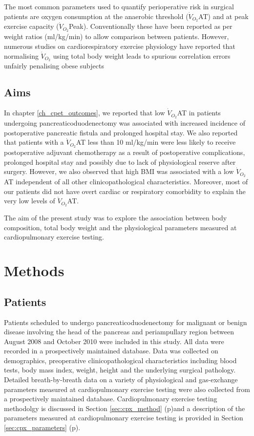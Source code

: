 The most common parameters used to quantify perioperative risk in surgical patients are oxygen consumption at the anaerobic threshold ($\dot{V}_{O_2}$AT) and at peak exercise capacity ($\dot{V}_{O_2}$Peak). Conventionally these have been reported as per weight ratios (ml/kg/min) to allow comparison between patients. However, numerous studies on cardiorespiratory exercise physiology have reported that normalising $\dot{V}_{O_2}$ using total body weight leads to spurious correlation errors unfairly penalising obese subjects \parencite{seltzer_body_1940, tanner_fallacy_1949, toth_examination_1993, batterham_modeling_1999, goran_total_2000, krachler_cardiopulmonary_2014} 

\subsection{Aims}
In chapter \ref{ch_cpet_outcomes}, we reported that low $\dot{V}_{O_2}$AT in patients undergoing pancreaticoduodenectomy was associated with increased incidence of postoperative pancreatic fistula and prolonged hospital stay. We also reported that patients with a $\dot{V}_{O_2}$AT less than 10 ml/kg/min were less likely to receive postoperative adjuvant chemotherapy as a result of postoperative complications, prolonged hospital stay and possibly due to lack of physiological reserve after surgery. However, we also observed that high BMI was associated with a low $\dot{V}_{O_2}$AT independent of all other clinicopathological characteristics. Moreover, most of our patients did not have overt cardiac or respiratory comorbidity to explain the very low levels of $\dot{V}_{O_2}$AT.

The aim of the present study was to explore the association between body composition, total body weight and the physiological parameters measured at cardiopulmonary exercise testing.

\clearpage
\section{Methods}

\subsection{Patients}
Patients scheduled to undergo pancreaticoduodenectomy for malignant or benign disease involving the head of the pancreas and periampullary region between August 2008 and October 2010 were included in this study. All data were recorded in a prospectively maintained database. Data was collected on demographics, preoperative clinicopathological characteristics including blood tests, body mass index, weight, height and the underlying surgical pathology. Detailed breath-by-breath data on a variety of physiological and gas-exchange parameters measured at cardiopulmonary exercise testing were also collected from a prospectively maintained database. Cardiopulmonary exercise testing methodolgy is discussed in Section \ref{sec:cpx_method} (p\pageref{sec:cpx_parameters})and a description of the parameters measured at cardiopulmonary exercise testing is provided in Section \ref{sec:cpx_parameters} (p\pageref{sec:cpx_parameters}).

